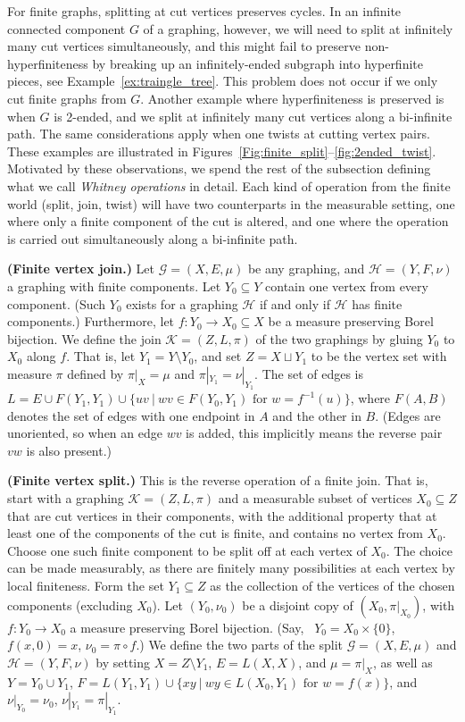 \documentclass{article}
\theoremstyle{plain}
\theoremstyle{definition}
\newcommand{\cG}{\mathcal{G}}
\newcommand{\cH}{\mathcal{H}}
\begin{document}
For finite graphs, splitting at cut vertices preserves cycles. In an infinite connected component $G$ of a graphing, however, we will need to split at infinitely many cut vertices simultaneously, and this might fail to preserve non-hyperfiniteness by breaking up an infinitely-ended subgraph into hyperfinite pieces, see Example~\ref{ex:traingle_tree}. This problem does not occur if we only cut finite graphs from $G$. Another example where hyperfiniteness is preserved is when $G$ is 2-ended, and we split at infinitely many cut vertices along a bi-infinite path. The same considerations apply when one twists at cutting vertex pairs. These examples are illustrated in Figures~\ref{Fig:finite_split}--\ref{fig:2ended_twist}. Motivated by these observations, we spend the rest of the subsection defining what we call \emph{Whitney operations} in detail. Each kind of operation from the finite world (split, join, twist) will have two counterparts in the measurable setting, one where only a finite component of the cut is altered, and one where the operation is carried out simultaneously along a bi-infinite path.


{\bf (Finite vertex join.)} Let $\cG=(X,E,\mu)$ be any graphing, and $\cH=(Y,F,\nu)$ a graphing with finite components. Let $Y_0 \subseteq Y$ contain one vertex from every component. (Such $Y_0$ exists for a graphing $\cH$ if and only if $\cH$ has finite components.) Furthermore, let $f:Y_0 \to X_0 \subseteq X$ be a measure preserving Borel bijection. We define the join $\mathcal{K}=(Z,L,\pi)$ of the two graphings by gluing $Y_0$ to $X_0$ along $f$. That is, let $Y_1=Y \setminus Y_0$, and set $Z=X\sqcup Y_1$ to be the vertex set with measure $\pi$ defined by $\pi|_{X}=\mu$ and $\pi|_{Y_1} = \nu|_{Y_1}$. The set of edges is $L=E \cup F(Y_1,Y_1) \cup \big\{uv ~\big|~ wv \in F(Y_0,Y_1) \textrm{ for } w=f^{-1}(u)\big\}$, where $F(A,B)$ denotes the set of edges with one endpoint in $A$ and the other in $B$. (Edges are unoriented, so when an edge $wv$ is added, this implicitly means the reverse pair $vw$ is also present.) 

{\bf (Finite vertex split.)} This is the reverse operation of a finite join. That is, start with a graphing $\mathcal{K}=(Z, L,\pi)$ and a measurable subset of vertices $X_0 \subseteq Z$ that are cut vertices in their components, with the additional property that at least one of the components of the cut is finite, and contains no vertex from $X_0$. Choose one such finite component to be split off at each vertex of $X_0$. The choice can be made measurably, as there are finitely many possibilities at each vertex by local finiteness. Form the set $Y_1 \subseteq Z$ as the collection of the vertices of the chosen components (excluding $X_0$). Let $(Y_0,\nu_0)$ be a disjoint copy of $(X_0, \pi|_{X_0})$, with $f: Y_0 \to X_0$ a measure preserving Borel bijection. (Say, \ $Y_0=X_0\times\{0\}$, $f(x,0)=x$, $\nu_0=\pi\circ f$.) We define the two parts of the split $\cG=(X,E,\mu)$ and $\cH=(Y,F,\nu)$ by setting $X=Z \setminus Y_1$, $E=L(X,X)$, and $\mu=\pi|_{X}$, as well as $Y=Y_0 \cup Y_1$, $F=L(Y_1,Y_1) \cup  \big\{xy ~\big|~ wy \in L(X_0,Y_1) \textrm{ for } w=f(x)\big\}$, and $\nu|_{Y_0} = \nu_0$, $\nu|_{Y_1}= \pi|_{Y_1}$. 
\end{document}
